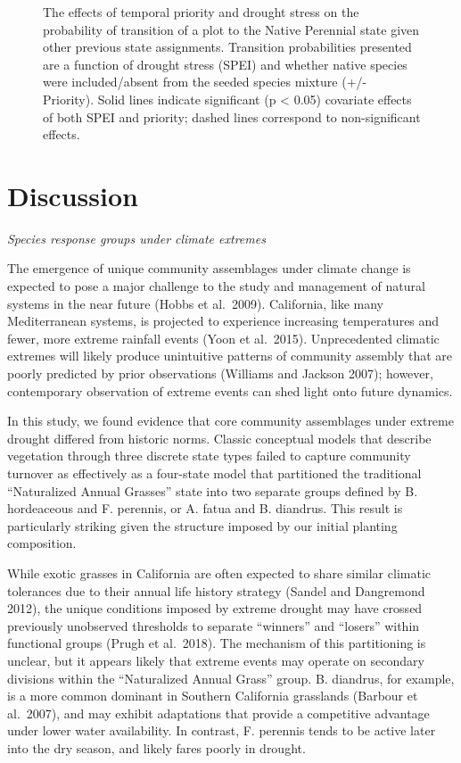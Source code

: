 \documentclass[twoside,12pt,final]{ucthesis-CA2012}
\begin{document}
\begin{ucmainmatter}
\begin{figure}
\caption{The effects of temporal priority and drought stress on the probability of transition of a plot to the Native Perennial state given other previous state assignments. Transition probabilities presented are a function of drought stress (SPEI) and whether native species were included/absent from the seeded species mixture (+/- Priority). Solid lines indicate significant (p \textless{} 0.05) covariate effects of both SPEI and priority; dashed lines correspond to non-significant effects. \label{fig-3-4}}
\end{figure}
\hypertarget{discussion}{%
\section{Discussion}\label{discussion}}

\emph{Species response groups under climate extremes}

The emergence of unique community assemblages under climate change is expected to pose a major challenge to the study and management of natural systems in the near future (Hobbs et al.~2009).
California, like many Mediterranean systems, is projected to experience increasing temperatures and fewer, more extreme rainfall events (Yoon et al.~2015).
Unprecedented climatic extremes will likely produce unintuitive patterns of community assembly that are poorly predicted by prior observations (Williams and Jackson 2007); however, contemporary observation of extreme events can shed light onto future dynamics.

In this study, we found evidence that core community assemblages under extreme drought differed from historic norms.
Classic conceptual models that describe vegetation through three discrete state types failed to capture community turnover as effectively as a four-state model that partitioned the traditional ``Naturalized Annual Grasses'' state into two separate groups defined by B. hordeaceous and F. perennis, or A. fatua and B. diandrus.
This result is particularly striking given the structure imposed by our initial planting composition.

While exotic grasses in California are often expected to share similar climatic tolerances due to their annual life history strategy (Sandel and Dangremond 2012), the unique conditions imposed by extreme drought may have crossed previously unobserved thresholds to separate ``winners'' and ``losers'' within functional groups (Prugh et al.~2018).
The mechanism of this partitioning is unclear, but it appears likely that extreme events may operate on secondary divisions within the ``Naturalized Annual Grass'' group.
B. diandrus, for example, is a more common dominant in Southern California grasslands (Barbour et al.~2007), and may exhibit adaptations that provide a competitive advantage under lower water availability.
In contrast, F. perennis tends to be active later into the dry season, and likely fares poorly in drought.


\end{ucmainmatter}
\end{document}
